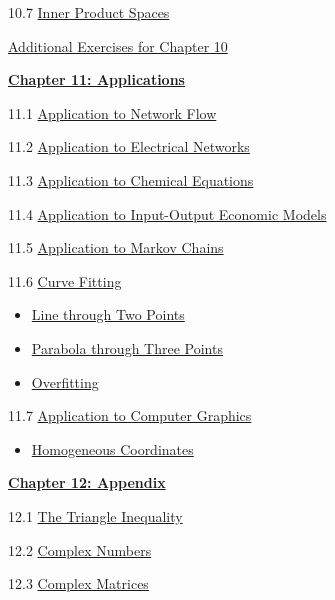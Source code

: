\documentclass{ximera}
\begin{document}
10.7	\href{https://ximera.osu.edu/linearalgebradzv3/LinearAlgebraInteractiveIntro/LTR-0080/main}{Inner Product Spaces}
	
\href{https://ximera.osu.edu/linearalgebradzv3/LinearAlgebraInteractiveIntro/SUPX-0100/main}{Additional Exercises for Chapter 10}
	
\href{https://ximera.osu.edu/linearalgebradzv3/LinearAlgebraInteractiveIntro/XLAChapter_applications/main}{\textbf{Chapter 11: Applications}}
	
11.1	\href{https://ximera.osu.edu/linearalgebradzv3/LinearAlgebraInteractiveIntro/APP-0010/main}{Application to Network Flow}
	
11.2	\href{https://ximera.osu.edu/linearalgebradzv3/LinearAlgebraInteractiveIntro/APP-0020/main}{Application to Electrical Networks}
	
11.3	\href{https://ximera.osu.edu/linearalgebradzv3/LinearAlgebraInteractiveIntro/APP-0030/main}{Application to Chemical Equations}
	
11.4	\href{https://ximera.osu.edu/linearalgebradzv3/LinearAlgebraInteractiveIntro/APP-0050/main}{Application to Input-Output Economic Models}
	
11.5	\href{https://ximera.osu.edu/linearalgebradzv3/LinearAlgebraInteractiveIntro/APP-0060/main}{Application to Markov Chains}

11.6 \href{https://ximera.osu.edu/linearalgebradzv3/LinearAlgebraInteractiveIntro/APP-0070/main}{Curve Fitting}

\begin{itemize}
    \item \href{https://www.geogebra.org/classic/aupuxe5j}{Line through Two Points}
    \item \href{https://www.geogebra.org/classic/m6mbcykf}{Parabola through Three Points}
    \item \href{https://www.geogebra.org/classic/z2qhxkmm}{Overfitting}
\end{itemize}
	
11.7	\href{https://ximera.osu.edu/linearalgebradzv3/LinearAlgebraInteractiveIntro/APP-0040/main}{Application to Computer Graphics}
\begin{itemize}
\item
\href{https://www.geogebra.org/m/yd5agbdg}{Homogeneous Coordinates}
\end{itemize}
	
\href{https://ximera.osu.edu/linearalgebradzv3/LinearAlgebraInteractiveIntro/XLAChapter_appendix/main}{\textbf{Chapter 12: Appendix}}
	
12.1	\href{https://ximera.osu.edu/linearalgebradzv3/LinearAlgebraInteractiveIntro/APX-0010/main}{The Triangle Inequality}
	
12.2	\href{https://ximera.osu.edu/linearalgebradzv3/LinearAlgebraInteractiveIntro/APX-0020/main}{Complex Numbers}
	
12.3
\href{https://ximera.osu.edu/linearalgebradzv3/LinearAlgebraInteractiveIntro/RTH-0050/main}{Complex Matrices}
\end{document}
